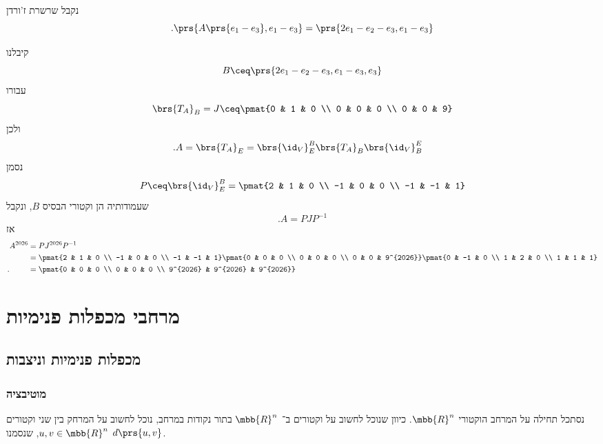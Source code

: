 \documentclass[a4paper,10pt,twoside,openany]{book}
\begin{document}
\begin{solution}
\begin{description}
נקבל שרשרת ז'ורדן
\[\text{.} \prs{A\prs{e_1 - e_3}, e_1 - e_3} = \prs{2e_1 - e_2 - e_3, e_1 - e_3}\]

\item[מסקנה:]
קיבלנו
\[B \ceq \prs{2e_1 - e_2 - e_3, e_1 - e_3, e_3}\]
עבורו
\[\brs{T_A}_B = J \ceq \pmat{0 & 1 & 0 \\ 0 & 0 & 0 \\ 0 & 0 & 9}\]
ולכן
\begin{align*}
\text{.} A &= \brs{T_A}_E
= \brs{\id_V}^{B}_E \brs{T_A}_B \brs{\id_V}^E_B
\end{align*}
נסמן
\[P \ceq \brs{\id_V}^B_E = \pmat{2 & 1 & 0 \\ -1 & 0 & 0 \\ -1 & -1 & 1}\]
שעמודותיה הן וקטורי הבסיס
$B$,
ונקבל
\[\text{.} A = P J P^{-1}\]
אז
\begin{align*}
A^{2026} &= P J^{2026} P^{-1}
\\&= \pmat{2 & 1 & 0 \\ -1 & 0 & 0 \\ -1 & -1 & 1} \pmat{0 & 0 & 0 \\ 0 & 0 & 0 \\ 0 & 0 & 9^{2026}} \pmat{0 & -1 & 0 \\ 1 & 2 & 0 \\ 1 & 1 & 1}
\\ \text{.} \hphantom{A^{2026}} &= \pmat{0 & 0 & 0 \\ 0 & 0 & 0 \\ 9^{2026} & 9^{2026} & 9^{2026}}
\end{align*}
\end{description}
\end{solution}

\part{מרחבי מכפלות פנימיות}

\chapter{מכפלות פנימיות וניצבות}

\section{מוטיבציה}

נסתכל תחילה על המרחב הוקטורי
$\mbb{R}^n$.
כיוון שנוכל לחשוב על וקטורים ב־%
$\mbb{R}^n$
בתור נקודות במרחב, נוכל לחשוב על המרחק בין שני וקטורים
$u,v \in \mbb{R}^n$,
שנסמנו
$d\prs{u,v}$.
\end{document}
